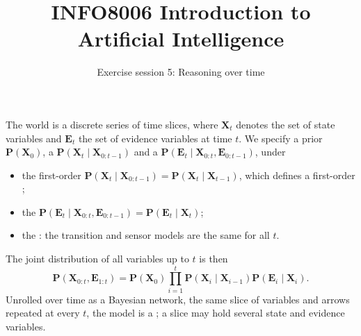 \documentclass[11pt, a4paper]{exam}
\title{\bfseries INFO8006 Introduction to Artificial Intelligence}
\author{Exercise session 5: Reasoning over time}
\date{}
\begin{document}
\maketitle

\begin{recap}
    The world is a discrete series of time slices, where $\mathbf{X}_t$ denotes the set of  state variables and $\mathbf{E}_t$ the set of  evidence variables at time $t$. We specify a prior $\mathbf{P}(\mathbf{X}_0)$, a  $\mathbf{P}(\mathbf{X}_t \mid \mathbf{X}_{0:t-1})$ and a  $\mathbf{P}(\mathbf{E}_t \mid \mathbf{X}_{0:t}, \mathbf{E}_{0:t-1})$, under
    \begin{itemize}
        \item the first-order  $\mathbf{P}(\mathbf{X}_t \mid \mathbf{X}_{0:t-1}) = \mathbf{P}(\mathbf{X}_t \mid \mathbf{X}_{t-1})$, which defines a first-order ;
        \item the  $\mathbf{P}(\mathbf{E}_t \mid \mathbf{X}_{0:t}, \mathbf{E}_{0:t-1}) = \mathbf{P}(\mathbf{E}_t \mid \mathbf{X}_t)$;
        \item the : the transition and sensor models are the same for all $t$.
    \end{itemize}
    The joint distribution of all variables up to $t$ is then
    \[
        \mathbf{P}(\mathbf{X}_{0:t}, \mathbf{E}_{1:t}) = \mathbf{P}(\mathbf{X}_0) \prod_{i=1}^t \mathbf{P}(\mathbf{X}_i \mid \mathbf{X}_{i-1}) \mathbf{P}(\mathbf{E}_i \mid \mathbf{X}_i).
    \]
    Unrolled over time as a Bayesian network, the same slice of variables and arrows repeated at every $t$, the model is a ; a slice may hold several state and evidence variables.


\end{recap}
\end{document}
